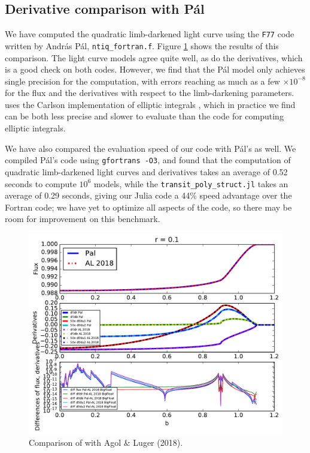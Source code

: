 \documentclass[modern]{aastex61}
\begin{document}
\subsection{Derivative comparison with P\'al}

We have computed the quadratic limb-darkened light curve using the \texttt{F77}
code written by Andr\'as P\'al, \texttt{ntiq\_fortran.f}.  
Figure \ref{fig:Pal_comparison} shows the results of this comparison.
The light curve models agree quite well, as do the derivatives, which is
a good check on both codes.  However, we find that the P\'al model only
achieves single precision for the computation, with errors reaching as
much as a few $\times 10^{-8}$ for the flux and the derivatives with
respect to the limb-darkening parameters.  \citet{Pal2008} uses the
Carlson implementation of elliptic integrals \citep{Carlson1979},
which in practice we find can be both less precise and slower to
evaluate than the \citet{Bulirsch1965a} code for computing elliptic
integrals.

We have also compared the evaluation speed of our code with P\'al's as well.
We compiled P\'al's code using \texttt{gfortrans -O3}, and found that
the computation of quadratic limb-darkened light curves and
derivatives takes an average of 0.52 seconds to compute $10^6$ models, 
while the \texttt{transit\_poly\_struct.jl} takes an average of 0.29 seconds, 
giving our Julia code a 44\% speed advantage over the Fortran code;
we have yet to optimize all aspects of the code, so there may be room
for improvement on this benchmark.

\begin{figure}
    \begin{centering}
    \includegraphics[width=\linewidth]{figures/julia/compare_pal_r0pt1.pdf}
    \caption{Comparison of \citet{Pal2008} with Agol \& Luger (2018).}
    \label{fig:Pal_comparison}
    \end{centering} 
\end{figure}
\end{document}
